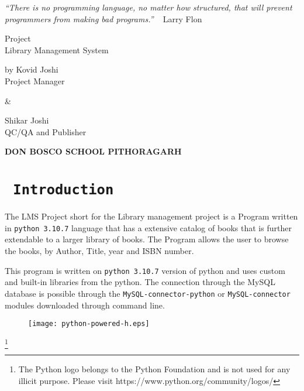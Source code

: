 \documentclass[12pt, a4paper, titlepage, openany]{report}
\begin{document}
\begin{titlepage}
\centering
{\emph{``There is no programming language, no matter how structured, that will prevent programmers from making bad programs.''} ~ Larry Flon}\par
\vfill

{\huge  Project \\Library Management System}\par

\vspace{5cm}
{\LARGE by Kovid Joshi \\Project Manager}\par
\vspace{10mm}
{\&}\par
\vspace{10mm}
{\LARGE Shikar Joshi \\QC/QA and Publisher}\par
\vfill
{\huge \bf \rmfamily DON BOSCO SCHOOL PITHORAGARH}\par
\vspace{3cm}

\end{titlepage}


\section*{\centering \texttt{ Introduction}}
\begin{sloppypar}
	The LMS Project short for the Library management project is a Program written in \verb+python 3.10.7+ language that has a extensive catalog of books that is further extendable to a larger library of books. The Program allows the user to browse the books, by Author, Title, year and ISBN number.

This program is written on \verb+python 3.10.7+ version of python and uses custom and built-in libraries from the python. The connection through the MySQL database is possible through the \verb+MySQL-connector-python+ or \verb+MySQL-connector+ modules downloaded through command line.

\begin{figure}
\centering
\texttt{[image: python-powered-h.eps]}
\end{figure}
\footnote{The Python logo belongs to the Python Foundation and is not used for any illicit purpose. Please visit https://www.python.org/community/logos/ }
\end{sloppypar}
\end{document}
